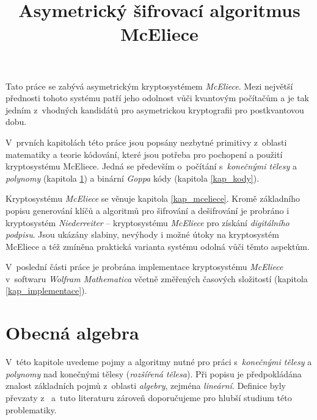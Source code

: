 \documentclass[thesis=M,czech,hidelinks]{FITthesis}[2012/06/26]
\title{Asymetrický šifrovací algoritmus McEliece}
\newcommand{\0}{{\textcolor[gray]{0.75}{0}}}
\begin{document}

\begin{introduction}


Tato práce se zabývá asymetrickým kryptosystémem \emph{McEliece}. Mezi největší
přednosti tohoto systému patří jeho odolnost vůči kvantovým počítačům a je tak
jedním z~vhodných kandidátů pro asymetrickou kryptografii pro postkvantovou
dobu.

V~prvních kapitolách této práce jsou popsány nezbytné primitivy z~oblasti
matematiky a teorie kódování, které jsou potřeba pro pochopení a použití
kryptosystému McEliece. Jedná se především o~počítání s~\emph{konečnými tělesy}
a \emph{polynomy} (kapitola \ref{kap_telesa}) a binární \emph{Goppa} kódy
(kapitola \ref{kap_kody}).

Kryptosystému \emph{McEliece} se věnuje kapitola \ref{kap_mceliece}. Kromě
základního popisu generování klíčů a algoritmů pro šifrování a dešifrování je
probráno i kryptosystém \emph{Niederreiter} --  kryptosystému
\emph{McEliece} pro získání \emph{digitálního podpisu}. Jsou ukázány slabiny,
nevýhody i možné útoky na kryptosystém McEliece a též zmíněna praktická varianta
systému odolná vůči těmto aspektům.

V~poslední části  práce je probrána implementace kryptosystému \emph{McEliece}
v~softwaru \emph{Wolfram Mathematica} včetně změřených časových
složitostí (kapitola \ref{kap_implementace}).

\end{introduction}





\chapter{Obecná algebra}\label{kap_telesa}

V~této kapitole uvedeme pojmy a algoritmy nutné pro práci s~\emph{konečnými
tělesy} a \emph{polynomy} nad konečnými tělesy (\emph{rozšířená tělesa}). Při
popisu je předpokládána znalost základních pojmů z~oblasti \emph{algebry},
zejména \emph{lineární}. Definice byly převzaty z~\cite{Paar,Mares,Pytlicek}
a~tuto literaturu zároveň doporučujeme pro hlubší studium této problematiky.
\end{document}
